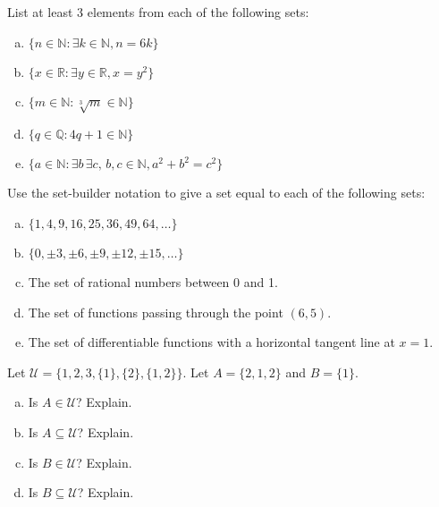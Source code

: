 \documentclass[11pt,letterpaper]{article}
\begin{document}

 List at least 3 elements from each of the following sets:
        \begin{enumerate}[(a)]
        \item $\{ n \in \mathbb{N} \colon \exists k \in \mathbb{N}, n= 6k \}$
        \item $\{ x \in \mathbb{R} \colon \exists y \in \mathbb{R}, x= y^2 \}$
        \item $\{ m \in \mathbb{N} \colon \sqrt[3]{m} \in \mathbb{N} \}$
        \item $\{ q \in \mathbb{Q} \colon 4q + 1 \in \mathbb{N} \}$
        \item $\{ a \in \mathbb{N} \colon \exists b\, \exists c,\, b, c \in \mathbb{N}, a^2 + b^2= c^2 \}$
        \end{enumerate}





\newpage





 Use the set-builder notation to give a set equal to each of the following sets:
        \begin{enumerate}[(a)]
        \item $\{ 1, 4, 9, 16, 25, 36, 49, 64, \ldots \}$
        \item $\{ 0, \pm 3, \pm 6, \pm 9, \pm 12, \pm 15, \ldots \}$
        \item The set of rational numbers between 0 and 1.  
        \item The set of functions passing through the point $(6, 5)$. 
        \item The set of differentiable functions with a horizontal tangent line at $x= 1$.
        \end{enumerate}





\newpage





 Let $\mathscr{U}= \{ 1, 2, 3, \{1\}, \{2\}, \{1,2\} \}$. Let $A= \{ 2, 1, 2 \}$ and $B= \{ 1 \}$. 
	\begin{enumerate}[(a)]
	\item Is $A \in \mathscr{U}$? Explain.
	\item Is $A \subseteq \mathscr{U}$? Explain.
	\item Is $B \in \mathscr{U}$? Explain. 
	\item Is $B \subseteq \mathscr{U}$? Explain. 
	\end{enumerate}
\end{document}
